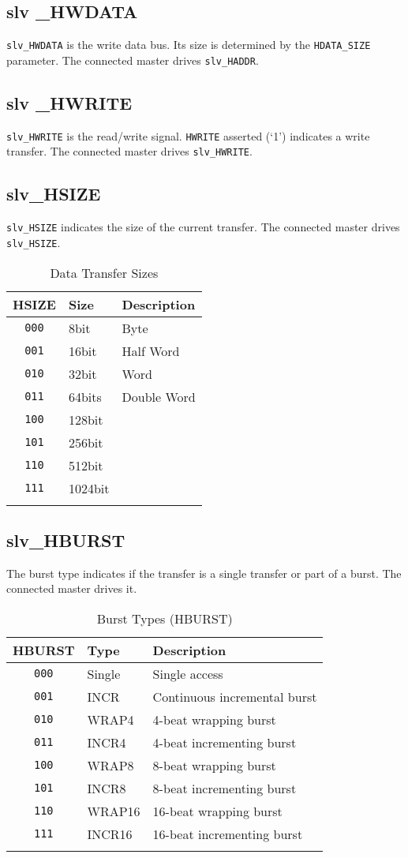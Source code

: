 \subsection{slv \_HWDATA}\label{slv-_hwdata}

\texttt{slv\_HWDATA} is the write data bus. Its size is determined by the
\texttt{HDATA\_SIZE} parameter. The connected master drives \texttt{slv\_HADDR}.

\subsection{slv \_HWRITE}\label{slv-_hwrite}

\texttt{slv\_HWRITE} is the read/write signal. \texttt{HWRITE} asserted (`1') indicates a
write transfer. The connected master drives \texttt{slv\_HWRITE}.

\subsection{slv\_HSIZE}\label{slv_hsize}

\texttt{slv\_HSIZE} indicates the size of the current transfer. The connected
master drives \texttt{slv\_HSIZE}.

\begin{longtable}[]{@{}cll@{}}
\toprule
HSIZE & Size & Description\tabularnewline
\midrule
\endhead
\texttt{000} & 8bit    & Byte\tabularnewline
\texttt{001} & 16bit   & Half Word\tabularnewline
\texttt{010} & 32bit   & Word\tabularnewline
\texttt{011} & 64bits  & Double Word\tabularnewline
\texttt{100} & 128bit  & \tabularnewline
\texttt{101} & 256bit  & \tabularnewline
\texttt{110} & 512bit  & \tabularnewline
\texttt{111} & 1024bit & \tabularnewline
\bottomrule
\caption{Data Transfer Sizes}
\end{longtable}

\subsection{slv\_HBURST}\label{slv_hburst}

The burst type indicates if the transfer is a single transfer or part of
a burst. The connected master drives it.

\begin{longtable}[]{@{}cll@{}}
\toprule
HBURST & Type & Description\tabularnewline
\midrule
\endhead
\texttt{000} & Single & Single access\tabularnewline
\texttt{001} & INCR   & Continuous incremental burst\tabularnewline
\texttt{010} & WRAP4  & 4-beat wrapping burst\tabularnewline
\texttt{011} & INCR4  & 4-beat incrementing burst\tabularnewline
\texttt{100} & WRAP8  & 8-beat wrapping burst\tabularnewline
\texttt{101} & INCR8  & 8-beat incrementing burst\tabularnewline
\texttt{110} & WRAP16 & 16-beat wrapping burst\tabularnewline
\texttt{111} & INCR16 & 16-beat incrementing burst\tabularnewline
\bottomrule
\caption{Burst Types (HBURST)}
\end{longtable}

